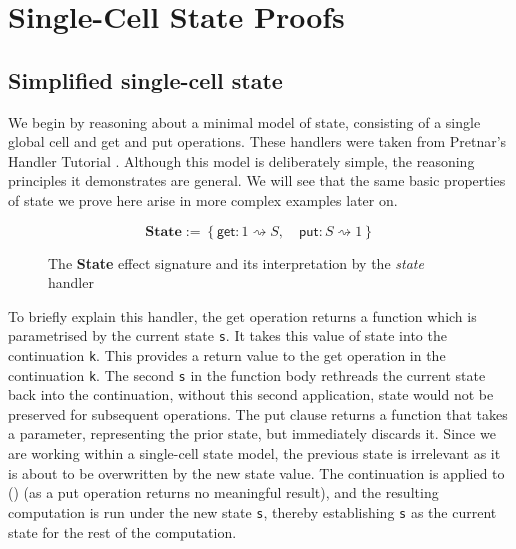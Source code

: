 \documentclass[logo,bsc,singlespacing,parskip]{infthesis}
\begin{document}
\section{Single-Cell State Proofs}

\subsection{Simplified single-cell state}

\label{subsec:simplified-state}
We begin by reasoning about a minimal model of state, consisting of a single global cell and get and put operations. These handlers were taken from Pretnar's Handler Tutorial \cite{pretnar_introduction_2015}. Although this model is deliberately simple, the reasoning principles it demonstrates are general. We will see that the same basic properties of state we prove here arise in more complex examples later on.  

\begin{figure}[H]
\centering

\[
\textbf{State} := \left\{
\mathsf{get} : 1 \rightsquigarrow S, \quad
\mathsf{put} : S \rightsquigarrow 1
\right\}
\]


\caption{The \textbf{State} effect signature and its interpretation by the \textit{state} handler}
\label{fig:state-handler}
\end{figure}

To briefly explain this handler, the get operation returns a function which is parametrised by the current state \lstinline{s}. It takes this value of state into the continuation \lstinline{k}. This provides a return value to the get operation in the continuation \lstinline{k}. The second \lstinline{s} in the function body rethreads the current state back into the continuation, without this second application, state would not be preserved for subsequent operations. 
The put clause returns a function that takes a parameter, representing the prior state, but immediately discards it. Since we are working within a single-cell state model, the previous state is irrelevant as it is about to be overwritten by the new state value. The continuation is applied to () (as a put operation returns no meaningful result), and the resulting computation is run under the new state \lstinline{s}, thereby establishing \lstinline{s} as the current state for the rest of the computation.
\end{document}

